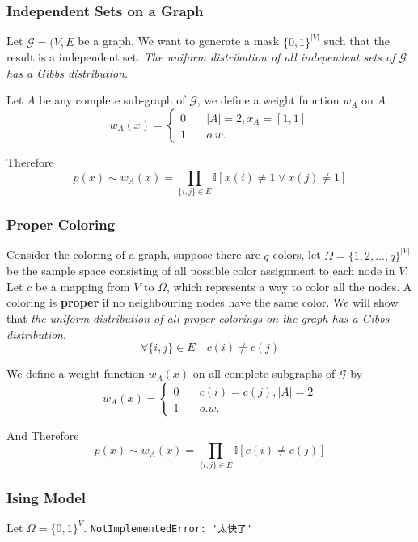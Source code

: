        \subsubsection{Independent Sets on a Graph}
        Let $\mathcal{G}=(V,E$ be a graph. We want to generate a mask $\{0,1\}^{|V|}$ such that the result is a independent set. \emph{The uniform distribution of all independent sets of $\mathcal{G}$ has a Gibbs distribution}.

        Let $A$ be any complete sub-graph of $\mathcal{G}$, we define a weight function $w_A$ on $A$
        \[ w_A(x) = \begin{cases}
            0 &\quad |A| = 2, x_A = [1,1]\\
            1 &\quad o.w.
        \end{cases} \] 

        Therefore
        \[ p(x) \sim w_A(x) = \prod_{\{i,j\}\in E}\mathbb{I}[x(i) \neq 1 \vee x(j) \neq 1] \]

        \subsubsection{Proper Coloring}
        Consider the coloring of a graph, suppose there are $q$ colors, let $\Omega=\{1,2,\dots,q\}^{|V|}$ be the sample space consisting of all possible color assignment to each node in $V$. Let $c$ be a mapping from $V$ to $\Omega$, which represents a way to color all the nodes. A coloring is \textbf{proper} if no neighbouring nodes have the same color. We will show that \emph{the uniform distribution of all proper colorings on the graph has a Gibbs distribution}.
        \[ \forall \{i,j\} \in E \quad c(i) \neq c(j) \]

        We define a weight function $w_A(x)$ on all complete subgraphs of $\mathcal{G}$ by
        \[ w_A(x) = \begin{cases}
            0 &\quad c(i) = c(j), |A|=2\\
            1 &\quad o.w.
        \end{cases} \]

        And Therefore
        \[ p(x) \sim w_A(x) = \prod_{\{i,j\} \in E}\mathbb{I}[c(i) \neq c(j)] \]

        \subsubsection{Ising Model}
        Let $\Omega = \{0,1\}^V$. \verb|NotImplementedError: '太快了'|

